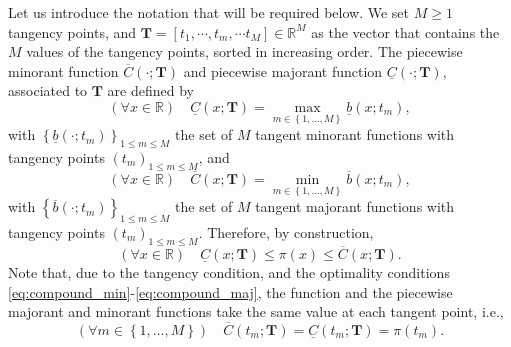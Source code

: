 \documentclass[review]{elsarticle}
\newcommand{\bR}{\mathbb{R}}
\newcommand{\emilie}[1]{\textcolor{magenta}{\textbf{[{\em EMILIE SAYS}: #1]}}}
\newcommand{\victor}[1]{\textcolor{blue}{\textbf{[{\em VICTOR SAYS}: #1]}}}
\begin{document}
Let us introduce the notation that will be required below. We set $M \geq 1$ tangency points, and $\mathbf{T} = \left[t_1, \cdots, t_m, \cdots t_M\right] \in \mathbb{R}^M$ as the vector that contains the $M$ values of the tangency points, sorted in increasing order. 
The piecewise minorant function $\overline{C}(\cdot;\mathbf{T})$ and piecewise majorant function $\underline{C}(\cdot;\mathbf{T})$, associated to $\mathbf{T}$ are defined by
\begin{equation}
(\forall x \in \bR) \quad \underline{C}(x;\mathbf{T}) = \max_{m \in \left\{1,\ldots,M\right\}} \underline{b}(x;t_m),
\label{eq:compound_min}
\end{equation}
with $\left\{\underline{b}(\cdot;t_m)\right\}_{1 \leq m \leq M}$ the set of $M$ tangent minorant functions with tangency points $(t_m)_{1 \leq m \leq M}$, and
\begin{equation}
(\forall x \in \bR) \quad \overline{C}(x;\mathbf{T}) = \min_{m \in \left\{1,\ldots,M\right\}} \overline{b}(x;t_m),
\label{eq:compound_maj}
\end{equation}
with $\left\{\overline{b}(\cdot;t_m)\right\}_{1 \leq m \leq M}$ the set of $M$ tangent majorant functions with tangency points $(t_m)_{1 \leq m \leq M}$. Therefore, by construction,
\begin{equation}
(\forall x \in \bR) \quad \underline{C}(x;\mathbf{T}) \leq \pi(x) \leq \overline{C}(x;\mathbf{T}). \label{eq:enveloppepi}
\end{equation}
Note that, due to the tangency condition, and the optimality conditions \eqref{eq:compound_min}-\eqref{eq:compound_maj}, the function and the piecewise majorant and minorant functions take the same value at each tangent point, i.e., 
\begin{equation}
(\forall m \in \left\{1,\ldots,M\right\}) \quad \overline{C}(t_m;\mathbf{T}) = \underline{C}(t_m;\mathbf{T}) = \pi(t_m).
\end{equation}
%
\end{document}
